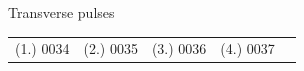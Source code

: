 \begin{eocexercises}{Transverse pulses}
\begin{enumerate}[noitemsep, label=\textbf{\arabic*}. ]
\end{enumerate}
  \label{m38802**end}
  \label{21d48a6f8839b4b265192acd9ea3d978**end}
\par \practiceinfo
 \par \begin{tabular}[h]{ccccc}
 (1.) 0034  &  (2.) 0035  &  (3.) 0036  &  (4.) 0037  \end{tabular}
\end{eocexercises}
